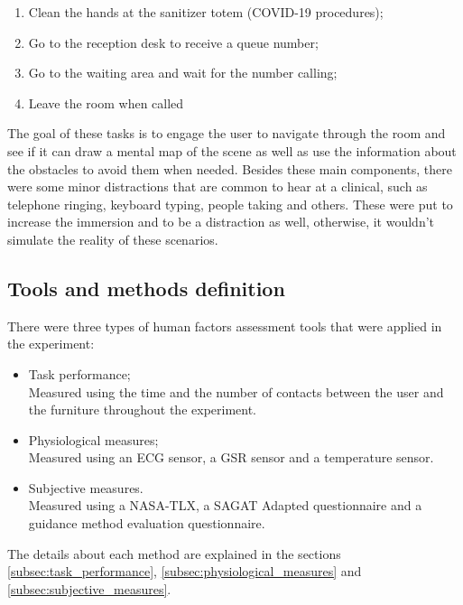         \begin{enumerate}
            \item Clean the hands at the sanitizer totem (COVID-19 procedures);
            \item Go to the reception desk to receive a queue number;
            \item Go to the waiting area and wait for the number calling;
            \item Leave the room when called \label{itm:n_tasks}
        \end{enumerate}
        
        
        
        The goal of these tasks is to engage the user to navigate through the room and see if it can draw a mental map of the scene as well as use the information about the obstacles to avoid them when needed. Besides these main components, there were some minor distractions that are common to hear at a clinical, such as telephone ringing, keyboard typing, people taking and others. These were put to increase the immersion and to be a distraction as well, otherwise, it wouldn't simulate the reality of these scenarios.
    
    \subsection{Tools and methods definition}
        There were three types of human factors assessment tools that were applied in the experiment:
        \begin{itemize}
            \item Task performance; \\  Measured using the time and the number of contacts between the user and the furniture throughout the experiment.
            \item Physiological measures; \\ Measured using an ECG sensor, a GSR sensor and a temperature sensor.
            \item Subjective measures. \\ Measured using a NASA-TLX, a SAGAT Adapted questionnaire and a guidance method evaluation questionnaire.
        \end{itemize}
        The details about each method are explained in the sections \ref{subsec:task_performance}, \ref{subsec:physiological_measures} and \ref{subsec:subjective_measures}.
        
